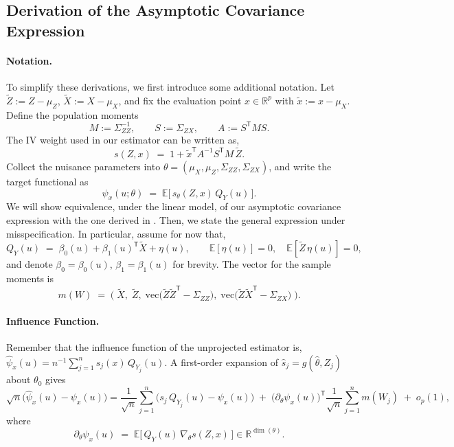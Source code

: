 \documentclass[12pt]{article}
\newcommand{\E}{\mathbb{E}}
\newcommand{\T}{\mathsf{T}} %
\newcommand{\R}{\mathbb{R}} %
\begin{document}
\subsection{Derivation of the  Asymptotic Covariance Expression} \label{sec:covariance_derivation}

\paragraph{Notation.}
To simplify these derivations, we first introduce some additional notation. Let $\widetilde Z := Z - \mu_Z$, $\widetilde X := X - \mu_X$, and fix the evaluation point $x\in\mathbb R^p$ with $\tilde x := x-\mu_X$.
Define the population moments
\[
M := \Sigma_{ZZ}^{-1},\qquad S := \Sigma_{ZX},\qquad A := S^{\T} M S.
\]
The IV weight used in our estimator can be written as,
\[
s(Z,x)\;=\; 1 + \tilde x^{\T} A^{-1} S^{\T} M\,\widetilde Z.
\]
Collect the nuisance parameters into $\theta=(\mu_X,\mu_Z,\Sigma_{ZZ},\Sigma_{ZX})$, and write the target functional as
\[
\psi_x(u;\theta)\;=\; \E\!\big[\, s_\theta(Z,x)\,Q_Y(u)\,\big].
\]
We will show equivalence, under the linear model, of our asymptotic covariance expression with the one derived in \citet{chetverikov2016iv}. Then, we state the general expression under misspecification. In particular, assume for now that,
\[
Q_Y(u) \;=\; \beta_0(u) + \beta_1(u)^{\T}\widetilde X + \eta(u),
\qquad \E[\eta(u)]=0,\quad \E[\widetilde Z\,\eta(u)]=0,
\]
and denote $\beta_0=\beta_0(u)$, $\beta_1=\beta_1(u)$ for brevity. The vector for the sample moments is
\[
m(W)\;=\;\Big(\;\widetilde X,\;\widetilde Z,\;\mathrm{vec}\big(\widetilde Z\widetilde Z^{\T}-\Sigma_{ZZ}\big),\;\mathrm{vec}\big(\widetilde Z\widetilde X^{\T}-\Sigma_{ZX}\big)\;\Big).
\]


\paragraph{Influence Function.}

Remember that the influence function of the unprojected estimator is, 
$\hat\psi_x(u)=n^{-1}\sum_{j=1}^n \hat s_j(x)\,Q_{Y_j}(u)$. A first-order expansion of $\hat s_j=g(\hat\theta,Z_j)$ about $\theta_0$ gives
\[
\sqrt{n}\big(\hat\psi_x(u)-\psi_x(u)\big)
= \frac{1}{\sqrt{n}}\sum_{j=1}^n\Big(s_j\,Q_{Y_j}(u)-\psi_x(u)\Big)
\;+\;\Big(\partial_\theta\psi_x(u)\Big)^{\T} \frac{1}{\sqrt{n}}\sum_{j=1}^n m(W_j)
\;+\;o_p(1),
\]
where
\[
\partial_\theta\psi_x(u) \;=\; \E\!\big[\,Q_Y(u)\,\nabla_\theta s(Z,x)\,\big]\in\R^{\dim(\theta)}.
\]
\end{document}
